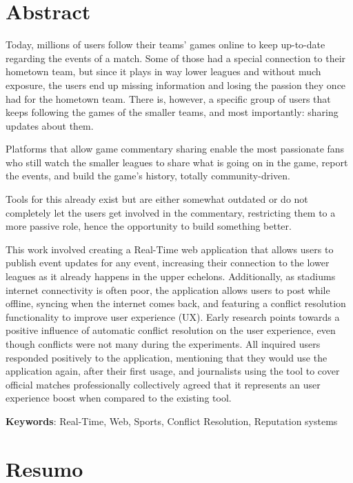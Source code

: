 \chapter*{Abstract}

Today, millions of users follow their teams' games online to keep up-to-date regarding the events of a match. Some of those had a special connection to their hometown team, but since it plays in way lower leagues and without much exposure,  the users end up missing information and losing the passion they once had for the hometown team. There is, however,  a specific group of users that keeps following the games of the smaller teams, and most importantly: sharing updates about them. 

Platforms that allow game commentary sharing enable the most passionate fans who still watch the smaller leagues to share what is going on in the game, report the events, and build the game's history, totally community-driven. 

Tools for this already exist but are either somewhat outdated or do not completely let the users get involved in the commentary, restricting them to a more passive role, hence the opportunity to build something better. 

This work involved creating a Real-Time web application that allows users to publish event updates for any event, increasing their connection to the lower leagues as it already happens in the upper echelons. Additionally, as stadiums internet connectivity is often poor, the application allows users to post while offline, syncing when the internet comes back, and featuring a conflict resolution functionality to improve user experience (UX). Early research points towards a positive influence of automatic conflict resolution on the user experience, even though conflicts were not many during the experiments. All inquired users responded positively to the application, mentioning that they would use the application again, after their first usage, and journalists using the tool to cover official matches professionally collectively agreed that it represents an user experience boost when compared to the existing tool. 


\vspace*{10mm}\noindent
\textbf{Keywords}: Real-Time, Web, Sports, Conflict Resolution, Reputation systems

\chapter*{Resumo}

